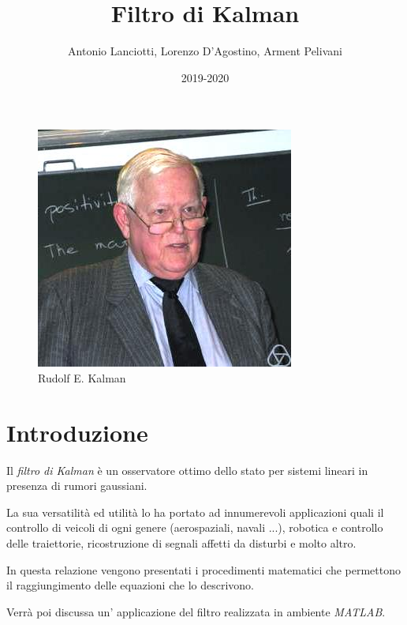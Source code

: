 \documentclass{article}
\title{Filtro di Kalman}
\author{Antonio Lanciotti, Lorenzo D'Agostino, Arment Pelivani}
\date{2019-2020}
\numberwithin{equation}{section}
\begin{document}
\maketitle

\begin{figure}[ht]
\centering
\includegraphics[scale=1]{Rudolf_Kalman} 
\caption{Rudolf E. Kalman}
\label{fig:kalman}
\end{figure}

\newpage

\tableofcontents

\newpage



\section{Introduzione}
Il \textit{filtro di Kalman} è un osservatore ottimo dello stato per sistemi lineari in presenza di rumori gaussiani.

La sua versatilità ed utilità lo ha portato ad innumerevoli applicazioni quali il controllo di veicoli di ogni genere (aerospaziali, navali ...), robotica e controllo delle traiettorie, ricostruzione di segnali affetti da disturbi e molto altro.

In questa relazione vengono presentati i procedimenti matematici che permettono il raggiungimento delle equazioni che lo descrivono.

Verrà poi discussa un' applicazione del filtro realizzata in ambiente \textit{MATLAB}.

\newpage















\newpage
\nocite{conti}


\end{document}
